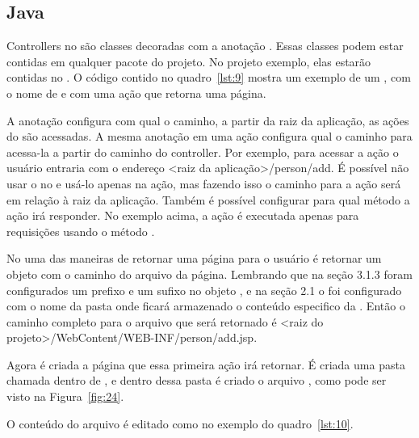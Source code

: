 
\subsection{Java}

Controllers no  são classes decoradas com a anotação . Essas classes podem estar contidas em qualquer pacote do projeto. No projeto exemplo, elas estarão contidas no . O código contido no quadro~\ref{lst:9} mostra um exemplo de um , com o nome de  e com uma ação que retorna uma página.


A anotação  configura com qual o caminho, a partir da raiz da aplicação, as ações do  são acessadas. A mesma anotação em uma ação configura qual o caminho para acessa-la a partir do caminho do controller. Por exemplo, para acessar a ação  o usuário entraria com o endereço <raiz da aplicação>/person/add. É possível não usar o  no  e usá-lo apenas na ação, mas fazendo isso o caminho para a ação será em relação à raiz da aplicação. Também é possível configurar para qual método  a ação irá responder. No exemplo acima, a ação é executada apenas para requisições usando o método .

No  uma das maneiras de retornar uma página para o usuário é retornar um objeto  com o caminho do arquivo da página. Lembrando que na seção 3.1.3 foram configurados um prefixo e um sufixo no objeto , e na seção 2.1 o  foi configurado com o nome da pasta onde ficará armazenado o conteúdo especifico da . Então o caminho completo para o arquivo que será retornado é <raiz do projeto>/WebContent/WEB-INF/person/add.jsp.

Agora é criada a página que essa primeira ação irá retornar. É criada uma pasta chamada  dentro de , e dentro dessa pasta é criado o arquivo , como pode ser visto na Figura~\ref{fig:24}.


O conteúdo do arquivo  é editado como no exemplo do quadro~\ref{lst:10}.

